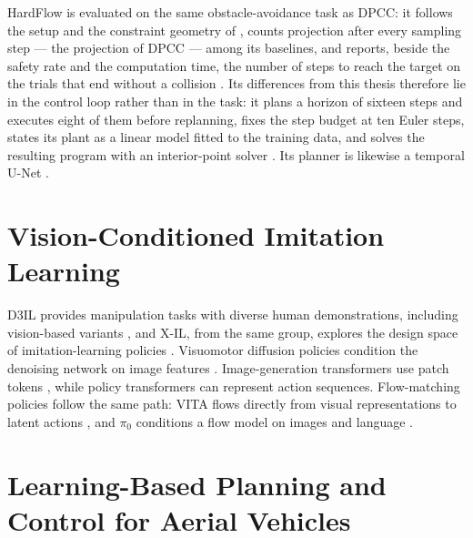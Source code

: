 \documentclass[headsepline,footsepline,footinclude=false,oneside,fontsize=11pt,paper=a4,listof=totoc,bibliography=totoc]{scrbook}
\theoremstyle{definition}
\theoremstyle{plain}
\theoremstyle{remark}
\begin{document}
HardFlow is evaluated on the same obstacle-avoidance task as \ac{DPCC}: it follows the setup and the
constraint geometry of \parencite{romer2025diffusion}, counts projection after every sampling step ---
the projection of \ac{DPCC} --- among its baselines, and reports, beside the safety rate and the
computation time, the number of steps to reach the target on the trials that end without a collision
\parencite[Sec.~VII-A, Table~II]{li2025hardflow}. Its differences from this thesis therefore lie in the
control loop rather than in the task: it plans a horizon of sixteen steps and executes eight of them before replanning,
fixes the step budget at ten Euler steps, states its plant as a linear model fitted to the training
data, and solves the resulting program with an interior-point solver
\parencite[App.~C]{li2025hardflow}. Its planner is likewise a temporal U-Net
\parencite{janner2022planning}.

\section{Vision-Conditioned Imitation Learning}\label{sec:rel:visual}

D3IL provides manipulation tasks with diverse human demonstrations, including vision-based variants
\parencite{jia2024towards}, and X-IL, from the same group, explores the design space of
imitation-learning policies \parencite{jia2025xil}. Visuomotor diffusion policies condition the
denoising network on image features \parencite{chi2023diffusion}. Image-generation transformers use
patch tokens \parencite{peebles2022dit}, while policy transformers can represent action sequences. Flow-matching policies follow the same path: VITA flows
directly from visual representations to latent actions \parencite{gao2025vita}, and $\pi_0$ conditions
a flow model on images and language \parencite{black2024pi0}.

\section{Learning-Based Planning and Control for Aerial Vehicles}\label{sec:rel:aerial}
\end{document}
